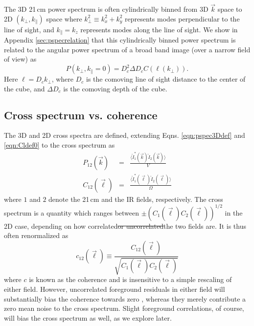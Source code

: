 \documentclass[numberedappendix]{emulateapj}
\providecommand{\DIFadd}[1]{{\protect\color{blue}\uwave{#1}}} %
\providecommand{\DIFdel}[1]{{\protect\color{red}\sout{#1}}}                      %
\providecommand{\DIFaddbegin}{} %
\providecommand{\DIFaddend}{} %
\providecommand{\DIFdelbegin}{} %
\providecommand{\DIFdelend}{} %
\begin{document}
The 3D 21\,cm power spectrum is often cylindrically binned from 3D $\vec{k}$ space to 2D $(k_\perp,k_\parallel)$ space where $k_\perp^2\equiv k_x^2+k_y^2$ represents modes perpendicular to the line of sight, and $k_\parallel=k_z$ represents modes along the line of sight. We show in Appendix \ref{sec:pspecrelation} that this cylindrically binned power spectrum is related to the angular power spectrum of a broad band image (over a narrow field of view) as
\begin{equation}
\label{eqn:convertP3toP2}
P(k_\perp,k_\parallel=0)=D_c^2 \Delta D_c C(\ell(k_\perp)).
\end{equation}
Here $\ell=D_c k_\perp$, where $D_c$ is the comoving line of sight distance to the center of the cube, and $\Delta D_c$ is the comoving depth of the cube.

\subsection{Cross spectrum vs. coherence}

The 3D and 2D cross spectra are defined, extending Eqns. \ref{eqn:pspec3Ddef} and \ref{eqn:Cldef0} to the cross spectrum as
\begin{eqnarray}
	P_{12}(\vec{k}) &=& \frac{\langle\tilde{I}_1^*(\vec{k})\tilde{I}_2(\vec{k})\rangle}{V}\\
	C_{12}(\vec{\ell}) &=& \frac{\langle \tilde{I}_1^*(\vec{\ell})\tilde{I}_2(\vec{\ell})\rangle}{\Omega}
\end{eqnarray}
where $1$ and $2$ denote the 21\,cm and the IR fields, respectively. The cross spectrum is a quantity which ranges between $\pm(C_{1}(\vec{\ell})C_{2}(\vec{\ell}))^{1/2}$ in the 2D case, depending on how correlated\DIFdelbegin \DIFdel{or uncorrelated}\DIFdelend \DIFaddbegin \DIFadd{, uncorrelated, or anticorrelated }\DIFaddend the two fields are. It is thus often renormalized as  
\begin{equation}
\label{eqn:Cldefcross}
	c_{12}(\vec{\ell}) \equiv \frac{C_{12}(\vec{\ell}) }{\sqrt{C_1(\vec{\ell})  C_2(\vec{\ell}) }}
\end{equation}
where $c$ is known as the coherence and is insensitive to a simple rescaling of either field. However, uncorrelated foreground residuals in either field will substantially bias the coherence towards zero \citep{lidz09,furlanettolidz07}, whereas they merely contribute a zero mean noise to the cross spectrum. Slight foreground correlations, of course, will bias the cross spectrum as well, as we explore later. 
\end{document}
